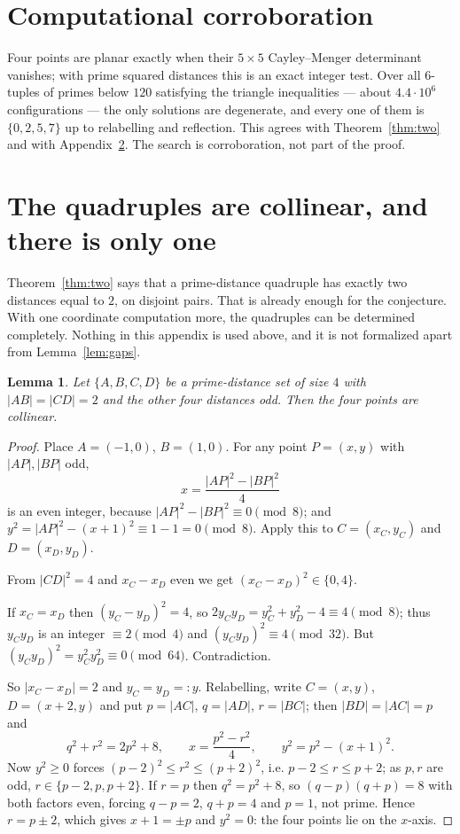 \documentclass[11pt]{article}
\theoremstyle{plain}
\newtheorem{lemma}[theorem]{Lemma}
\theoremstyle{definition}
\theoremstyle{remark}
\begin{document}
\section{Computational corroboration}

Four points are planar exactly when their $5\times5$ Cayley--Menger determinant
vanishes; with prime squared distances this is an exact integer test. Over all
$6$-tuples of primes below $120$ satisfying the triangle inequalities --- about
$4.4\cdot10^6$ configurations --- the only solutions are degenerate, and every
one of them is $\{0,2,5,7\}$ up to relabelling and reflection. This agrees with
Theorem~\ref{thm:two} and with Appendix~\ref{sec:appendix}. The search is
corroboration, not part of the proof.

\appendix

\section{The quadruples are collinear, and there is only one}
\label{sec:appendix}

Theorem~\ref{thm:two} says that a prime-distance quadruple has exactly two
distances equal to $2$, on disjoint pairs. That is already enough for the
conjecture. With one coordinate computation more, the quadruples can be
determined completely. Nothing in this appendix is used above, and it is not
formalized apart from Lemma~\ref{lem:gaps}.

\begin{lemma}\label{lem:coll}
Let $\{A,B,C,D\}$ be a prime-distance set of size $4$ with $|AB|=|CD|=2$ and the
other four distances odd. Then the four points are collinear.
\end{lemma}

\begin{proof}
Place $A=(-1,0)$, $B=(1,0)$. For any point $P=(x,y)$ with $|AP|,|BP|$ odd,
\[
  x=\frac{|AP|^2-|BP|^2}{4}
\]
is an even integer, because $|AP|^2-|BP|^2\equiv0\pmod 8$; and
$y^2=|AP|^2-(x+1)^2\equiv1-1=0\pmod 8$. Apply this to $C=(x_C,y_C)$ and
$D=(x_D,y_D)$.

From $|CD|^2=4$ and $x_C-x_D$ even we get $(x_C-x_D)^2\in\{0,4\}$.

If $x_C=x_D$ then $(y_C-y_D)^2=4$, so $2y_Cy_D=y_C^2+y_D^2-4\equiv4\pmod8$; thus
$y_Cy_D$ is an integer $\equiv2\pmod4$ and $(y_Cy_D)^2\equiv4\pmod{32}$. But
$(y_Cy_D)^2=y_C^2y_D^2\equiv0\pmod{64}$. Contradiction.

So $|x_C-x_D|=2$ and $y_C=y_D=:y$. Relabelling, write $C=(x,y)$, $D=(x+2,y)$ and
put $p=|AC|$, $q=|AD|$, $r=|BC|$; then $|BD|=|AC|=p$ and
\[
  q^2+r^2=2p^2+8,\qquad x=\frac{p^2-r^2}{4},\qquad y^2=p^2-(x+1)^2 .
\]
Now $y^2\ge0$ forces $(p-2)^2\le r^2\le(p+2)^2$, i.e. $p-2\le r\le p+2$; as $p,r$
are odd, $r\in\{p-2,p,p+2\}$. If $r=p$ then $q^2=p^2+8$, so $(q-p)(q+p)=8$ with
both factors even, forcing $q-p=2$, $q+p=4$ and $p=1$, not prime. Hence
$r=p\pm2$, which gives $x+1=\pm p$ and $y^2=0$: the four points lie on the
$x$-axis. \end{proof}
\end{document}
